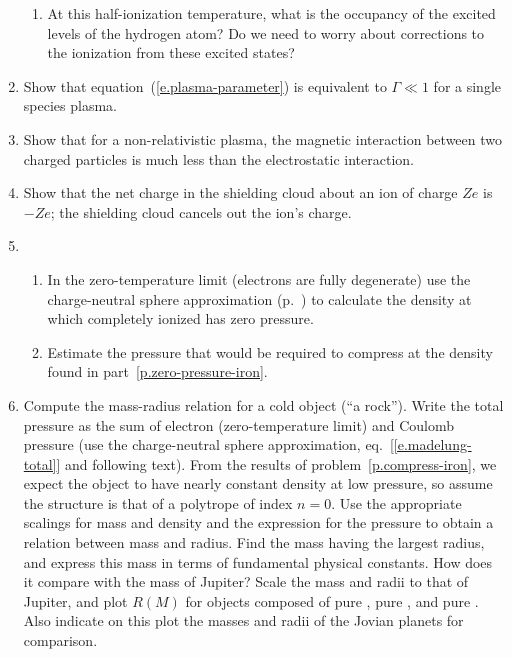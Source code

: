 \begin{enumerate}
\begin{enumerate}
\item At this half-ionization temperature, what is the occupancy of the excited levels of the hydrogen atom?  Do we need to worry about corrections to the ionization from these excited states?
\end{enumerate}

\item Show that equation~(\ref{e.plasma-parameter}) is equivalent to $\Gamma \ll 1$ for a single species plasma.

\item Show that for a non-relativistic plasma, the magnetic interaction between two charged particles is much less than the electrostatic interaction.

\item Show that the net charge in the shielding cloud about an ion of charge $Ze$ is $-Ze$; the shielding cloud cancels out the ion's charge.

\item 
\begin{enumerate} 
\item\label{p.zero-pressure-iron} In the zero-temperature limit (electrons are fully degenerate) use the charge-neutral sphere approximation (p.~\pageref{e.madelung-total}) to calculate the density at which completely ionized \iron[56] has zero pressure.

\item\label{p.compress-iron} Estimate the pressure that would be required to compress \iron[56] at the density found in part~\ref{p.zero-pressure-iron}.
\end{enumerate}

\item Compute the mass-radius relation for a cold object (``a rock''). Write the total pressure as the sum of electron (zero-temperature limit) and Coulomb pressure (use the charge-neutral sphere approximation, eq.~[\ref{e.madelung-total}] and following text).  From the results of problem~\ref{p.compress-iron}, we expect the object to have nearly constant density at low pressure, so assume the structure is that of a polytrope of index $n=0$.  Use the appropriate scalings for mass and density and the expression for the pressure to obtain a relation between mass and radius.  Find the mass having the largest radius, and express this mass in terms of fundamental physical constants.  How does it compare with the mass of Jupiter?  Scale the mass and radii to that of Jupiter, and plot $R(M)$ for objects composed of pure \hydrogen, pure \helium, and pure \carbon.  Also indicate on this plot the masses and radii of the Jovian planets for comparison.

\end{enumerate}
